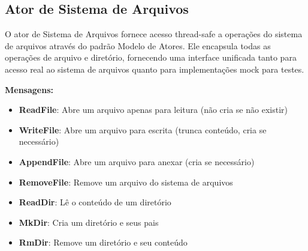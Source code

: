 \subsection{Ator de Sistema de Arquivos}

O ator de Sistema de Arquivos fornece acesso thread-safe a operações do sistema de arquivos através do padrão Modelo de Atores. Ele encapsula todas as operações de arquivo e diretório, fornecendo uma interface unificada tanto para acesso real ao sistema de arquivos quanto para implementações mock para testes.

\textbf{Mensagens:}

\begin{itemize}
    \item \textbf{ReadFile}: Abre um arquivo apenas para leitura (não cria se não existir)
    \item \textbf{WriteFile}: Abre um arquivo para escrita (trunca conteúdo, cria se necessário)
    \item \textbf{AppendFile}: Abre um arquivo para anexar (cria se necessário)
    \item \textbf{RemoveFile}: Remove um arquivo do sistema de arquivos
    \item \textbf{ReadDir}: Lê o conteúdo de um diretório
    \item \textbf{MkDir}: Cria um diretório e seus pais
    \item \textbf{RmDir}: Remove um diretório e seu conteúdo
\end{itemize}
